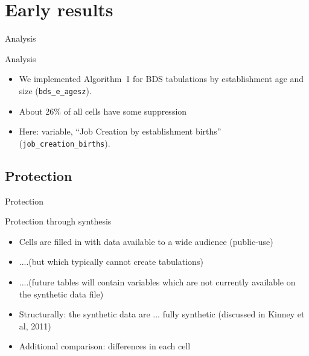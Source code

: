%


\section[Results]{Early results}


\begin{frame}{Analysis}
\begin{block}{Analysis}
\begin{itemize}[<+->]
\item We implemented Algorithm~1 for \ac{BDS} tabulations by \alert{establishment age and 
size} ({\tt bds\_e\_agesz}). 
\item About 26\% of all cells have some suppression
\item Here: variable, ``Job Creation by establishment births'' ({\tt job\_creation\_births}). 
\end{itemize}
\end{block}
\end{frame}

\subsection{Protection}
\begin{frame}{Protection}
\begin{block}{Protection through synthesis}
\begin{itemize}[<+->]
\item Cells are filled in with data available to a wide audience (public-use)
\item ....(but which typically cannot create tabulations)
\item ....(future tables will contain variables which are not currently available on the synthetic 
data file)
\item Structurally: the synthetic data are ... fully synthetic (discussed in Kinney et al, 2011)
\item Additional comparison: differences in each cell
\end{itemize}
\end{block}
\end{frame}


